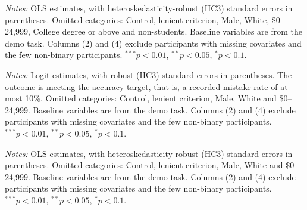 \documentclass[12pt, letterpaper]{article}
\begin{document}
\begin{table}[p]
\centering
\caption{Treatment effects on sets completed (lab sample)}\label{tab:reg-sets-lab}
\begin{threeparttable}
\scriptsize\renewcommand{\arraystretch}{0.85}

\begin{tablenotes}[flushleft]
\scriptsize
\item \textit{Notes:} OLS estimates, with heteroskedasticity-robust (HC3) standard errors in parentheses. Omitted categories: Control, lenient criterion, Male, White, \$0--24,999, College degree or above and non-students. Baseline variables are from the demo task. Columns (2) and (4) exclude participants with missing covariates and the few non-binary participants. $^{***}p<0.01$, $^{**}p<0.05$, $^{*}p<0.1$.
\end{tablenotes}
\end{threeparttable}
\end{table}

\begin{table}[p]
\centering
\caption{Treatment effects on accuracy target achievement likelihood (class sample)}\label{tab:reg-target-class}
\begin{threeparttable}
\scriptsize\renewcommand{\arraystretch}{0.85}

\begin{tablenotes}[flushleft]
\scriptsize
\item \textit{Notes:} Logit estimates, with robust (HC3) standard errors in parentheses. The outcome is meeting the accuracy target, that is, a recorded mistake rate of at most 10\%. Omitted categories: Control, lenient criterion, Male, White and \$0--24,999. Baseline variables are from the demo task. Columns (2) and (4) exclude participants with missing covariates and the few non-binary participants. $^{***}p<0.01$, $^{**}p<0.05$, $^{*}p<0.1$.
\end{tablenotes}
\end{threeparttable}
\end{table}

\begin{table}[p]
\centering
\caption{Treatment effects on mistake rates (class sample)}\label{tab:reg-mistakes-class}
\begin{threeparttable}
\scriptsize\renewcommand{\arraystretch}{0.85}

\begin{tablenotes}[flushleft]
\scriptsize
\item \textit{Notes:} OLS estimates, with heteroskedasticity-robust (HC3) standard errors in parentheses. Omitted categories: Control, lenient criterion, Male, White and \$0--24,999. Baseline variables are from the demo task. Columns (2) and (4) exclude participants with missing covariates and the few non-binary participants. $^{***}p<0.01$, $^{**}p<0.05$, $^{*}p<0.1$.
\end{tablenotes}
\end{threeparttable}
\end{table}
\end{document}

